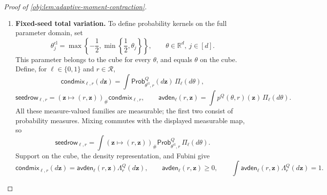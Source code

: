 \begin{proof}[Proof of \cref{obj:lem:adaptive-moment-contraction}]
\begin{enumerate}
For \(v<d\), set \(j=v+1\). Resampling coordinate \(j\) from \(\nu_0\) preserves \(\Pi_v^{\mathrm{hyb}}\); resampling it from \(\nu_1\) gives \(\Pi_{v+1}^{\mathrm{hyb}}\). Explicitly, with \(\#\) denoting pushforward,
\[
(\theta,u\mapsto\theta^{[j:u]})_\#
 (\Pi_v^{\mathrm{hyb}}\otimes\nu_0)=\Pi_v^{\mathrm{hyb}},
\qquad
(\theta,u\mapsto\theta^{[j:u]})_\#
 (\Pi_v^{\mathrm{hyb}}\otimes\nu_1)=\Pi_{v+1}^{\mathrm{hyb}}.
\]
Fubini therefore gives
\[
\mathsf{avg}_v^r(\mathbf z)-\mathsf{avg}_{v+1}^r(\mathbf z)
=
\int\mathsf{diff}^{\theta,r}_j(\mathbf z)\,
 \Pi_v^{\mathrm{hyb}}(d\theta).
\]
The triangle inequality under the integral, followed by the single-coordinate estimate, yields
\[
\begin{split}
\int
 |\mathsf{avg}_v^r-\mathsf{avg}_{v+1}^r|\,d\Lambda_r^Q
&\le
\int
 \left\{\int|\mathsf{diff}^{\theta,r}_j(\mathbf z)|
              \Lambda_r^Q(d\mathbf z)\right\}
 \Pi_v^{\mathrm{hyb}}(d\theta)\\
&\le2\alpha^k\sqrt{\binom nk}\,\beta^k.
\end{split}
\]
Telescoping the \(d\) replacements now gives
\[
\begin{split}
&\int
 \left|
 \int p^Q(\theta,r)(\mathbf z)\,\Pi_0(d\theta)
 -\int p^Q(\theta,r)(\mathbf z)\,\Pi_1(d\theta)
 \right|
 \Lambda_r^Q(d\mathbf z)\\
&\qquad
=\int|\mathsf{avg}_0^r-\mathsf{avg}_d^r|\,d\Lambda_r^Q\\
&\qquad
\le\sum_{v=0}^{d-1}
 \int|\mathsf{avg}_v^r-\mathsf{avg}_{v+1}^r|\,d\Lambda_r^Q\\
&\qquad
\le2d\alpha^k\sqrt{\binom nk}\,\beta^k.
\end{split}
\]

\item \textbf{Fixed-seed total variation.}
To define probability kernels on the full parameter domain, set
\[
\theta^{\mathrm{cl}}_j
=\max\left\{-\frac12,\min\left\{\frac12,\theta_j\right\}\right\},
\qquad
\theta\in\mathbb R^d,\ j\in[d].
\]
This parameter belongs to the cube for every \(\theta\), and equals \(\theta\) on the cube. Define, for \(\ell\in\{0,1\}\) and \(r\in\mathcal R\),
\[
\mathsf{condmix}_{\ell,r}(d\mathbf z)
=\int\mathsf{Prob}^Q_{\theta^{\mathrm{cl}},r}(d\mathbf z)\,
 \Pi_\ell(d\theta),
\]
\[
\mathsf{seedrow}_{\ell,r}
=(\mathbf z\mapsto(r,\mathbf z))_\#
 \mathsf{condmix}_{\ell,r},
\qquad
\mathsf{avden}_\ell(r,\mathbf z)
=\int p^Q(\theta,r)(\mathbf z)\,\Pi_\ell(d\theta).
\]
All these measure-valued families are measurable; the first two consist of probability measures. Mixing commutes with the displayed measurable map, so
\[
\mathsf{seedrow}_{\ell,r}
=
\int
 (\mathbf z\mapsto(r,\mathbf z))_\#
 \mathsf{Prob}^Q_{\theta^{\mathrm{cl}},r}\,
 \Pi_\ell(d\theta).
\]
Support on the cube, the density representation, and Fubini give
\[
\mathsf{condmix}_{\ell,r}(d\mathbf z)
=\mathsf{avden}_\ell(r,\mathbf z)\Lambda_r^Q(d\mathbf z),
\qquad
\mathsf{avden}_\ell(r,\mathbf z)\ge0,
\qquad
\int\mathsf{avden}_\ell(r,\mathbf z)\Lambda_r^Q(d\mathbf z)=1.
\]


\end{enumerate}
\end{proof}
